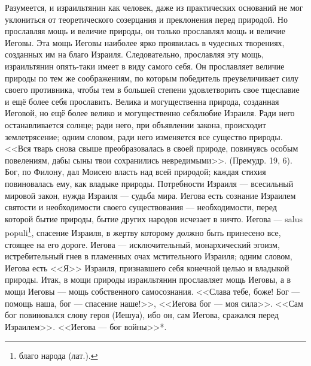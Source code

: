 \documentclass[12pt,oneside]{book}
\begin{document}
Разумеется, и израильтянин как человек, даже из практических оснований не мог уклониться от теоретического созерцания и преклонения перед природой. Но прославляя мощь и величие природы, он только прославлял мощь и величие Иеговы. Эта мощь Иеговы наиболее ярко проявилась в чудесных творениях, созданных им на благо Израиля. Следовательно, прославляя эту мощь, израильтянин опять-таки имеет в виду самого себя. Он прославляет величие природы по тем же соображениям, по которым победитель преувеличивает силу своего противника, чтобы тем в большей степени удовлетворить свое тщеславие и ещё более себя прославить. Велика и могущественна природа, созданная Иеговой, но ещё более велико и могущественно себялюбие Израиля. Ради него останавливается солнце; ради него, при объявлении закона, происходит землетрясение; одним словом, ради него изменяется все существо природы. <<Вся тварь снова свыше преобразовалась в своей природе, повинуясь особым повелениям, дабы сыны твои сохранились невредимыми>>. (Премудр. 19, 6). Бог, по Филону, дал Моисею власть над всей природой; каждая стихия повиновалась ему, как владыке природы. Потребности Израиля --- всесильный мировой закон, нужда Израиля --- судьба мира. Иегова есть сознание  Израилем святости и необходимости своего существования --- необходимости, перед которой бытие природы, бытие других народов исчезает в ничто. Иегова --- salus populi\footnote{благо народа (лат.).}, спасение Израиля, в жертву которому должно быть принесено все, стоящее на его дороге. Иегова --- исключительный, монархический эгоизм, истребительный гнев в пламенных очах мстительного Израиля; одним словом, Иегова есть <<Я>> Израиля, признавшего себя конечной целью и владыкой природы. Итак, в мощи природы израильтянин прославляет мощь Иеговы, а в мощи Иеговы --- мощь собственного самосознания. <<Слава тебе, боже! Бог --- помощь наша, бог --- спасение наше!>>, <<Иегова бог --- моя сила>>. <<Сам бог повиновался слову героя (Иешуа), ибо он, сам Иегова, сражался перед Израилем>>. <<Иегова --- бог войны>>*\let\svthefootnote\thefootnote\let\thefootnote\relax{}\let\thefootnote\svthefootnote.
\end{document}
